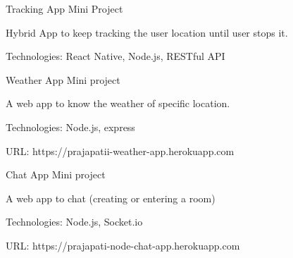 \begin{cventries}
    \cventry
    {} %
    {Tracking App} %
    {Mini Project} %
    {} %
    {
      \begin{cvitems} %
      	\item {Hybrid App to keep tracking the user location until user stops it.}
      	\item {Technologies: React Native, Node.js, RESTful API}
    \end{cvitems}
    }
    
    
  \cventry
    {} %
    {Weather App} %
    {Mini project} %
    {} %
    {
      \begin{cvitems} %
      	\item {A web app to know the weather of specific location. }
      	\item {Technologies: Node.js, express}
      	\item {URL: https://prajapatii-weather-app.herokuapp.com}
      \end{cvitems}
    }

    \cventry
    {} %
    {Chat App} %
    {Mini project} %
    {} %
    {
      \begin{cvitems} %
      	\item {A web app to chat (creating or entering a room) }
      	\item {Technologies: Node.js, Socket.io}
      	\item {URL: https://prajapati-node-chat-app.herokuapp.com}
      \end{cvitems}
    }
    
\end{cventries}